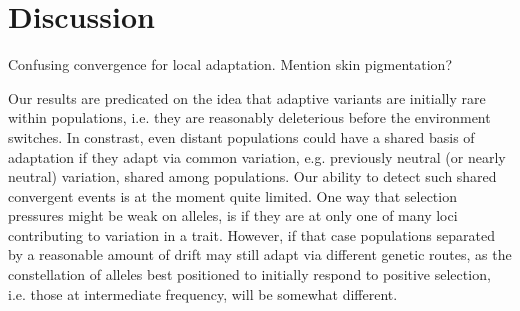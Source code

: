 \documentclass{article}
\begin{document}





\section{Discussion}


Confusing convergence for local adaptation. Mention skin pigmentation?

Our results are predicated on the idea that adaptive variants are
initially rare within populations, i.e. they are reasonably
deleterious before the environment switches. In constrast, even distant populations could have
a shared basis of adaptation if they adapt via common variation,
e.g. previously neutral (or nearly neutral) variation, shared among populations. 
Our ability to detect such shared convergent events is at the moment
quite limited. 
One way that selection pressures might be weak on alleles, is if they
are at only one of many loci contributing to variation in a trait. However, if that
case populations separated by a reasonable amount of drift may still
adapt via different genetic routes, as the constellation of alleles
best positioned to initially respond to positive selection, i.e. those at
intermediate frequency, will be somewhat different.  

\end{document}
